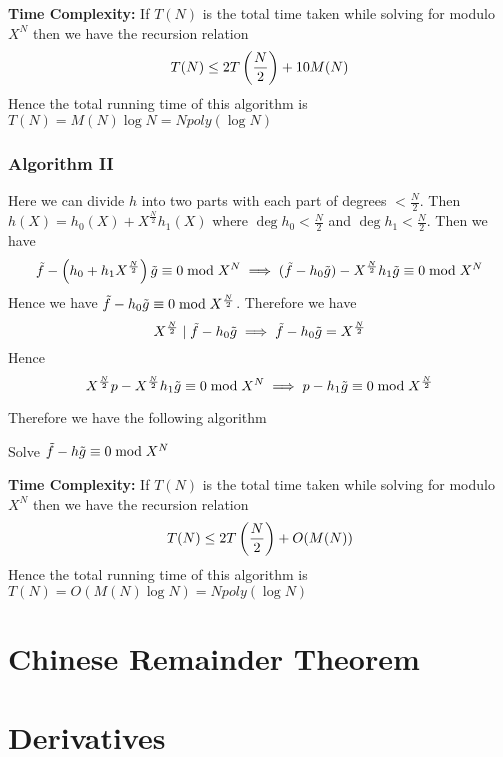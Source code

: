 \textbf{Time Complexity:} If $T(N)$ is the total time taken while solving for modulo $X^{N}$ then we have the recursion relation $$T(N)\leq 2T\left(\frac{N}2\right)+10M(N)$$Hence the total running time of this algorithm is $T(N)=M(N)\log N=Npoly(\log N)$\parinn
\subsubsection{Algorithm II}
Here we can divide $h$ into two parts with each part of degrees $< \frac{N}2$. Then $h(X)=h_0(X)+X^{\frac{N}2}h_1(X)$ where $\deg h_0<\frac{N}2$ and $\deg h_1<\frac{N}2$. Then we have 
$$
	\tilde{f}-\left(h_0+h_1X^{\frac{N}2}\right)\tilde{g}\equiv 0\bmod{X^N} \implies (\tilde{f}-h_0\tilde{g})-X^{\frac{N}2}h_1\tilde{g}\equiv 0 \bmod{X^N} $$Hence we have $\tilde{f}-h_0\tilde{g}\equiv 0\bmod{X^{\frac{N}2}}$. Therefore we have $$X^{\frac{N}2}\mid \tilde{f}-h_0\tilde{g}\implies \tilde{f}-h_0\tilde{g}=X^{\frac{N}2}$$ Hence $$X^{\frac{N}2}p-X^{\frac{N}2}h_1\tilde{g}\equiv 0\bmod{X^{N}}\implies p-h_1\tilde{g}\equiv 0\bmod{X^{\frac{N}2}}$$
	
	\newpage Therefore we have the following algorithm

\begin{algorithm}
	\DontPrintSemicolon
	\caption{Solve $\tilde{f}-h\tilde{g}\equiv 0\bmod {X^N}$}
\end{algorithm}\parinf\vspace{5mm}

\textbf{Time Complexity:} If $T(N)$ is the total time taken while solving for modulo $X^{N}$ then we have the recursion relation $$T(N)\leq 2T\left(\frac{N}2\right)+O(M(N))$$Hence the total running time of this algorithm is $T(N)=O(M(N)\log N)=Npoly(\log N)$\parinn


\section{Chinese Remainder Theorem}

\section{Derivatives}